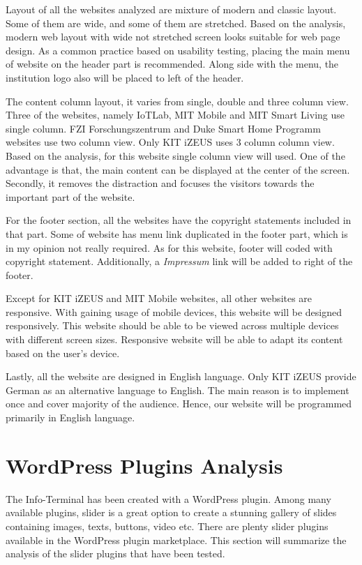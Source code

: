 Layout of all the websites analyzed are mixture of modern and classic layout. Some of them are wide, and some of them are stretched. Based on the analysis, modern web layout with wide not stretched screen looks suitable for web page design. As a common practice based on usability testing, placing the main menu of website on the header part is recommended. Along side with the menu, the institution logo also will be placed to left of the header.

The content column layout, it varies from single, double and three column view. Three of the websites, namely IoTLab, MIT Mobile and MIT Smart Living use single column. FZI Forschungszentrum and Duke Smart Home Programm websites use two column view. Only KIT iZEUS uses 3 column column view. Based on the analysis, for this website single column view will used. One of the advantage is that, the main content can be displayed at the center of the screen. Secondly, it removes the distraction and focuses the visitors towards the important part of the website.

For the footer section, all the websites have the copyright statements included in that part. Some of website has menu link duplicated in the footer part, which is in my opinion not really required. As for this website, footer will coded with copyright statement. Additionally, a \emph{Impressum} link will be added to right of the footer.

Except for KIT iZEUS and MIT Mobile websites, all other websites are responsive. With gaining usage of mobile devices, this website will be designed responsively. This website should be able to be viewed across multiple devices with different screen sizes. Responsive website will be able to adapt its content based on the user's device.

Lastly, all the website are designed in English language. Only KIT iZEUS provide German as an alternative language to English. The main reason is to implement once and cover majority of the audience. Hence, our website will be programmed primarily in English language.

\section{WordPress Plugins Analysis}
The Info-Terminal has been created with a WordPress plugin. Among many available plugins, slider \cite{SyedBalkhi.2015} is a great option to create a stunning gallery of slides containing images, texts, buttons, video etc. There are plenty slider plugins available in the WordPress plugin marketplace. This section will summarize the analysis of the slider plugins that have been tested.

